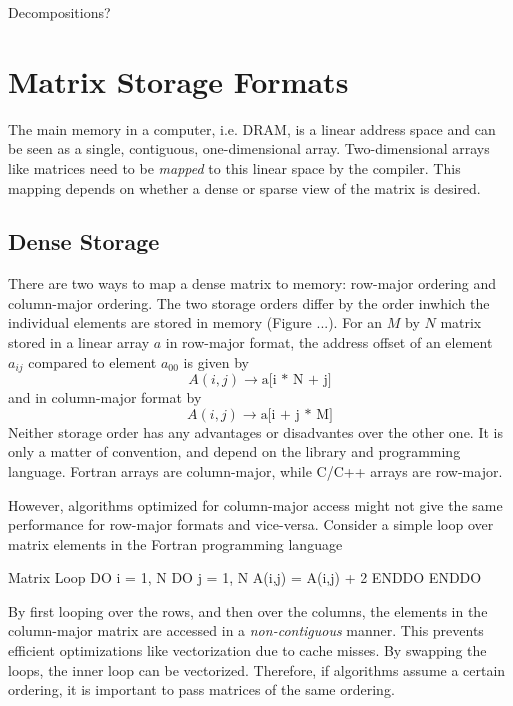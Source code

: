 Decompositions?

\section{Matrix Storage Formats}

The main memory in a computer, i.e. DRAM, is a linear address space and can be seen as a single, contiguous, one-dimensional array. Two-dimensional arrays like matrices need to be \emph{mapped} to this linear space by the compiler. This mapping depends on whether a dense or sparse view of the matrix is desired. 

\subsection{Dense Storage}

There are two ways to map a dense matrix to memory: row-major ordering and column-major ordering. The two storage orders differ by the order inwhich the individual elements are stored in memory (Figure ...). For an $M$ by $N$ matrix stored in a linear array $a$ in row-major format, the address offset of an element $a_{ij}$ compared to element $a_{00}$ is given by
\begin{equation}
A(i,j) \rightarrow \text{a[i * N + j]}
\end{equation}
\noindent and in column-major format by
\begin{equation}
A(i,j) \rightarrow \text{a[i + j * M]}
\end{equation}
Neither storage order has any advantages or disadvantes over the other one. It is only a matter of convention, and depend on the library and programming language. Fortran arrays are column-major, while C/C++ arrays are row-major. 

However, algorithms optimized for column-major access might not give the same performance for row-major formats and vice-versa. Consider a simple loop over matrix elements in the Fortran programming language
\begin{fortran}{Matrix Loop \label{FORTRAN1}}
DO i = 1, N
 DO j = 1, N
  A(i,j) = A(i,j) + 2
 ENDDO
ENDDO
\end{fortran}
\noindent By first looping over the rows, and then over the columns, the elements in the column-major matrix are accessed in a \emph{non-contiguous} manner. This prevents efficient optimizations like vectorization due to cache misses. By swapping the loops, the inner loop can be vectorized. Therefore, if algorithms assume a certain ordering, it is important to pass matrices of the same ordering.

